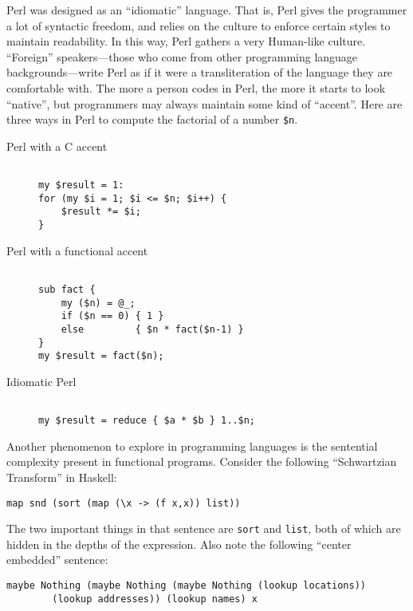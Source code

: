 \documentclass[12pt]{article}
\begin{document}
Perl was designed as an ``idiomatic'' language.  That is, Perl gives the
programmer a lot of syntactic freedom, and relies on the culture to
enforce certain styles to maintain readability.  In this way, Perl
gathers a very Human-like culture.  ``Foreign'' speakers---those who
come from other programming language backgrounds---write Perl as if it
were a transliteration of the language they are comfortable with.  The
more a person codes in Perl, the more it starts to look ``native'', but
programmers may always maintain some kind of ``accent''.    Here are
three ways in Perl to compute the factorial of a number \texttt{\$n}.

\begin{description}
\item[Perl with a C accent]
\begin{verbatim}

my $result = 1:
for (my $i = 1; $i <= $n; $i++) {
    $result *= $i;
}
\end{verbatim}

\item[Perl with a functional accent] 
\begin{verbatim}

sub fact {
    my ($n) = @_;
    if ($n == 0) { 1 }
    else         { $n * fact($n-1) }
}
my $result = fact($n);
\end{verbatim}

\item[Idiomatic Perl]
\begin{verbatim}

my $result = reduce { $a * $b } 1..$n;
\end{verbatim}
\end{description}

Another phenomenon to explore in programming languages is the sentential
complexity present in functional programs.  Consider the following
``Schwartzian Transform'' in Haskell:

\begin{verbatim}
map snd (sort (map (\x -> (f x,x)) list))
\end{verbatim}

The two important things in that sentence are \texttt{sort} and
\texttt{list}, both of which are hidden in the depths of the
expression.  Also note the following ``center embedded''
sentence:

\begin{verbatim}
maybe Nothing (maybe Nothing (maybe Nothing (lookup locations)) 
        (lookup addresses)) (lookup names) x
\end{verbatim}
\end{document}
